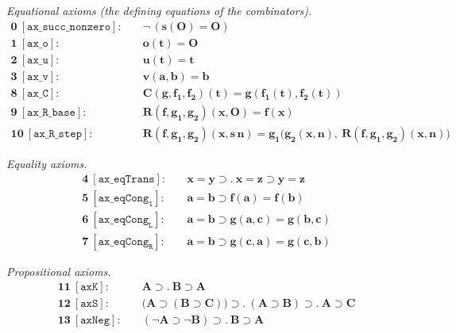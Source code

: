\documentclass[11pt]{article}
\theoremstyle{plain}
\theoremstyle{definition}
\theoremstyle{remark}
\begin{document}
\medskip
\noindent\emph{Equational axioms (the defining equations of the
combinators).}
\begin{align*}
\textbf{0}\ [\mathtt{ax\_succ\_nonzero}]:\quad & \neg\,(\mathbf{s}(\mathbf{O}) = \mathbf{O}) \\
\textbf{1}\ [\mathtt{ax\_o}]:\quad & \mathbf{o}(\mathbf{t}) = \mathbf{O} \\
\textbf{2}\ [\mathtt{ax\_u}]:\quad & \mathbf{u}(\mathbf{t}) = \mathbf{t} \\
\textbf{3}\ [\mathtt{ax\_v}]:\quad & \mathbf{v}(\mathbf{a},\mathbf{b}) = \mathbf{b} \\
\textbf{8}\ [\mathtt{ax\_C}]:\quad & \mathbf{C}(\mathbf{g},\mathbf{f_1},\mathbf{f_2})(\mathbf{t}) = \mathbf{g}(\mathbf{f_1}(\mathbf{t}), \mathbf{f_2}(\mathbf{t})) \\
\textbf{9}\ [\mathtt{ax\_R\_base}]:\quad & \mathbf{R}(\mathbf{f},\mathbf{g_1},\mathbf{g_2})(\mathbf{x}, \mathbf{O}) = \mathbf{f}(\mathbf{x}) \\
\textbf{10}\ [\mathtt{ax\_R\_step}]:\quad & \mathbf{R}(\mathbf{f},\mathbf{g_1},\mathbf{g_2})(\mathbf{x}, \mathbf{s}\,\mathbf{n}) = \mathbf{g_1}\bigl(\mathbf{g_2}(\mathbf{x},\mathbf{n}),\ \mathbf{R}(\mathbf{f},\mathbf{g_1},\mathbf{g_2})(\mathbf{x},\mathbf{n})\bigr)
\end{align*}

\noindent\emph{Equality axioms.}
\begin{align*}
\textbf{4}\ [\mathtt{ax\_eqTrans}]:\quad & \mathbf{x} = \mathbf{y} \supset .\ \mathbf{x} = \mathbf{z} \supset \mathbf{y} = \mathbf{z} \\
\textbf{5}\ [\mathtt{ax\_eqCong_1}]:\quad & \mathbf{a} = \mathbf{b} \supset \mathbf{f}(\mathbf{a}) = \mathbf{f}(\mathbf{b}) \\
\textbf{6}\ [\mathtt{ax\_eqCong_L}]:\quad & \mathbf{a} = \mathbf{b} \supset \mathbf{g}(\mathbf{a},\mathbf{c}) = \mathbf{g}(\mathbf{b},\mathbf{c}) \\
\textbf{7}\ [\mathtt{ax\_eqCong_R}]:\quad & \mathbf{a} = \mathbf{b} \supset \mathbf{g}(\mathbf{c},\mathbf{a}) = \mathbf{g}(\mathbf{c},\mathbf{b})
\end{align*}

\noindent\emph{Propositional axioms.}
\begin{align*}
\textbf{11}\ [\mathtt{axK}]:\quad & \mathbf{A} \supset .\ \mathbf{B} \supset \mathbf{A} \\
\textbf{12}\ [\mathtt{axS}]:\quad & \bigl(\mathbf{A} \supset (\mathbf{B} \supset \mathbf{C})\bigr) \supset .\ (\mathbf{A} \supset \mathbf{B}) \supset .\ \mathbf{A} \supset \mathbf{C} \\
\textbf{13}\ [\mathtt{axNeg}]:\quad & (\neg\mathbf{A} \supset \neg\mathbf{B}) \supset .\ \mathbf{B} \supset \mathbf{A}
\end{align*}
\end{document}
